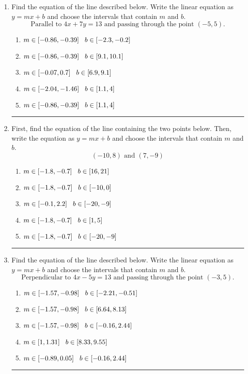 \documentclass[14pt]{extbook}
\newcommand{\litem}[1]{\item#1\hspace*{-1cm}\rule{\textwidth}{0.4pt}}
\begin{document}
\begin{enumerate}
\litem{
Find the equation of the line described below. Write the linear equation as $ y=mx+b $ and choose the intervals that contain $m$ and $b$.\[ \text{Parallel to } 4 x + 7 y = 13 \text{ and passing through the point } (-5, 5). \]\begin{enumerate}[label=\Alph*.]
\item \( m \in [-0.86, -0.39] \hspace*{3mm} b \in [-2.3, -0.2] \)
\item \( m \in [-0.86, -0.39] \hspace*{3mm} b \in [9.1, 10.1] \)
\item \( m \in [-0.07, 0.7] \hspace*{3mm} b \in [6.9, 9.1] \)
\item \( m \in [-2.04, -1.46] \hspace*{3mm} b \in [1.1, 4] \)
\item \( m \in [-0.86, -0.39] \hspace*{3mm} b \in [1.1, 4] \)

\end{enumerate} }
\litem{
First, find the equation of the line containing the two points below. Then, write the equation as $ y=mx+b $ and choose the intervals that contain $m$ and $b$.\[ (-10, 8) \text{ and } (7, -9) \]\begin{enumerate}[label=\Alph*.]
\item \( m \in [-1.8, -0.7] \hspace*{3mm} b \in [16, 21] \)
\item \( m \in [-1.8, -0.7] \hspace*{3mm} b \in [-10, 0] \)
\item \( m \in [-0.1, 2.2] \hspace*{3mm} b \in [-20, -9] \)
\item \( m \in [-1.8, -0.7] \hspace*{3mm} b \in [1, 5] \)
\item \( m \in [-1.8, -0.7] \hspace*{3mm} b \in [-20, -9] \)

\end{enumerate} }
\litem{
Find the equation of the line described below. Write the linear equation as $ y=mx+b $ and choose the intervals that contain $m$ and $b$.\[ \text{Perpendicular to } 4 x - 5 y = 13 \text{ and passing through the point } (-3, 5). \]\begin{enumerate}[label=\Alph*.]
\item \( m \in [-1.57, -0.98] \hspace*{3mm} b \in [-2.21, -0.51] \)
\item \( m \in [-1.57, -0.98] \hspace*{3mm} b \in [6.64, 8.13] \)
\item \( m \in [-1.57, -0.98] \hspace*{3mm} b \in [-0.16, 2.44] \)
\item \( m \in [1, 1.31] \hspace*{3mm} b \in [8.33, 9.55] \)
\item \( m \in [-0.89, 0.05] \hspace*{3mm} b \in [-0.16, 2.44] \)


\end{enumerate}}
\end{enumerate}
\end{document}
